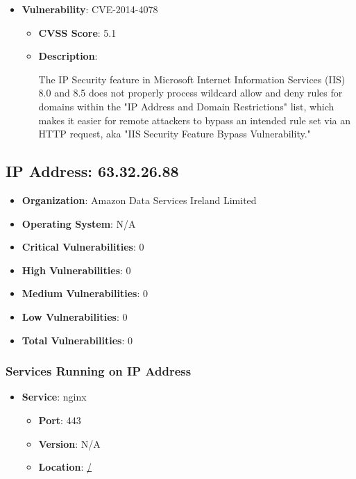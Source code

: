 \documentclass{article}
\begin{document}
\begin{itemize}
    
        \item \textbf{Vulnerability}: CVE-2014-4078
        \begin{itemize}
            \item \textbf{CVSS Score}:  5.1 
            \item \textbf{Description}:
            \parbox[t]{0.9\linewidth}{
                \ttfamily The IP Security feature in Microsoft Internet Information Services (IIS) 8.0 and 8.5 does not properly process wildcard allow and deny rules for domains within the "IP Address and Domain Restrictions" list, which makes it easier for remote attackers to bypass an intended rule set via an HTTP request, aka "IIS Security Feature Bypass Vulnerability."
            }
        \end{itemize}
    
\end{itemize}




\clearpage



\subsection{IP Address: 63.32.26.88}

\begin{itemize}
    \item \textbf{Organization}: Amazon Data Services Ireland Limited
    \item \textbf{Operating System}:  N/A 
    \item \textbf{Critical Vulnerabilities}: 0
    \item \textbf{High Vulnerabilities}: 0
    \item \textbf{Medium Vulnerabilities}: 0
    \item \textbf{Low Vulnerabilities}: 0
    \item \textbf{Total Vulnerabilities}: 0
\end{itemize}

\subsubsection*{Services Running on IP Address}

\begin{itemize}
    
        \item \textbf{Service}: nginx
        \begin{itemize}
            \item \textbf{Port}: 443
            \item \textbf{Version}:  N/A 
            \item \textbf{Location}: \href{ / }{ / }
        \end{itemize}
    
\end{itemize}
\end{document}
